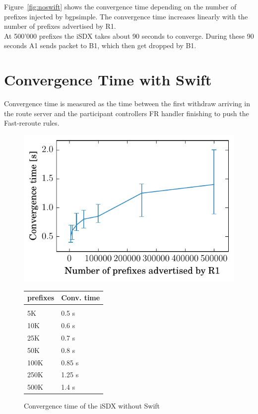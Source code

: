 Figure~\ref{fig:noswift} shows the convergence time depending on the number of prefixes injected by bgpsimple.
The convergence time increases linearly with the number of prefixes advertised by R1. \\
At 500'000 prefixes the iSDX takes about 90 seconds to converge. During these 90 seconds A1 sends packet to B1, which then get dropped by B1. 

\section{\label{chapter4:Convergence time with Swift}Convergence Time with Swift}

Convergence time is measured as the time between the first withdraw arriving in the route server and the participant controllers FR handler finishing to push the Fast-reroute rules. \\

\begin{figure}[h]
\centering
\begin{minipage}[t]{.4\textwidth}
\centering
\vspace{0pt}
\includegraphics[scale = 1]{Figures/swift.pdf}
\caption{Convergence time of the iSDX without Swift}
\label{fig:withswift}
\end{minipage}\hfill
\begin{minipage}[t]{.4\textwidth}
\centering
\vspace{0pt}
\begin{tabular}{@{}ll@{}}
	\\
	prefixes & Conv. time \\
	\hline
	\\
    5K & 0.5 s  \\
    10K & 0.6 s   \\
    25K & 0.7 s   \\
    50K & 0.8 s  \\
    100K & 0.85 s \\
    250K & 1.25 s   \\
    500K & 1.4 s  \\
\end{tabular}
\end{minipage}
\end{figure}

